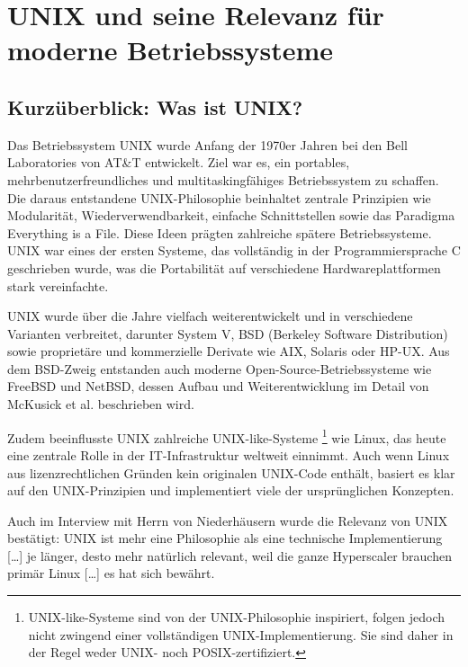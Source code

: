 \section{UNIX und seine Relevanz für moderne Betriebssysteme}


\subsection{Kurzüberblick: Was ist UNIX?}

Das Betriebssystem UNIX wurde Anfang der 1970er Jahren bei den Bell Laboratories von AT\&T entwickelt. Ziel war es, ein portables, mehrbenutzerfreundliches und
multitaskingfähiges Betriebssystem zu schaffen. Die daraus entstandene UNIX-Philosophie beinhaltet zentrale Prinzipien wie Modularität, Wiederverwendbarkeit,
einfache Schnittstellen sowie das Paradigma \glqq Everything is a File\grqq. Diese Ideen prägten zahlreiche spätere Betriebssysteme. UNIX war eines der ersten
Systeme, das vollständig in der Programmiersprache C geschrieben wurde, was die Portabilität auf verschiedene Hardwareplattformen stark vereinfachte.
\cite{ModernOS}

UNIX wurde über die Jahre vielfach weiterentwickelt und in verschiedene Varianten verbreitet, darunter System V, BSD (Berkeley Software Distribution) sowie
proprietäre und kommerzielle Derivate wie AIX, Solaris oder HP-UX. Aus dem BSD-Zweig entstanden auch moderne Open-Source-Betriebssysteme wie FreeBSD und NetBSD,
dessen Aufbau und Weiterentwicklung im Detail von McKusick et al. beschrieben wird. \cite{FreeBSDOS}

Zudem beeinflusste UNIX zahlreiche \glqq UNIX-like\grqq-Systeme \footnote{UNIX-like-Systeme sind von der UNIX-Philosophie inspiriert, folgen jedoch nicht zwingend
einer vollständigen UNIX-Implementierung. Sie sind daher in der Regel weder UNIX- noch POSIX-zertifiziert.} wie Linux, das heute eine zentrale Rolle in der
IT-Infrastruktur weltweit einnimmt. Auch wenn Linux aus lizenzrechtlichen Gründen kein originalen UNIX-Code enthält, basiert es klar auf den UNIX-Prinzipien und
implementiert viele der ursprünglichen Konzepten. \cite{ArtOfUnixProgramming}

Auch im Interview mit Herrn von Niederhäusern wurde die Relevanz von UNIX bestätigt: \glqq UNIX ist mehr eine Philosophie als eine technische Implementierung
[\ldots] je länger, desto mehr natürlich relevant, weil die ganze Hyperscaler brauchen primär Linux [\ldots] es hat sich bewährt.\grqq \ \cite{interviewNH}


